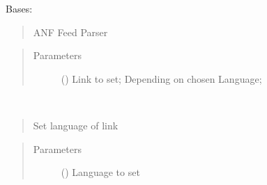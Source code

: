 \documentclass[letterpaper,10pt,english]{sphinxmanual}
\begin{document}
\begin{fulllineitems}
\label{\detokenize{anfrss.parser:anfrss.parser.anffeed.ANFFeed}}
Bases: 
\begin{quote}

ANF Feed Parser
\end{quote}
\begin{quote}\begin{description}
\item[{Parameters}] \leavevmode
{} () \textendash{} Link to set;
Depending on chosen
Language;

\end{description}\end{quote}

\begin{fulllineitems}
\label{\detokenize{anfrss.parser:anfrss.parser.anffeed.ANFFeed.source}}
\end{fulllineitems}


\begin{fulllineitems}
\label{\detokenize{anfrss.parser:anfrss.parser.anffeed.ANFFeed.set_language}}~\begin{quote}

Set language of link
\end{quote}
\begin{quote}\begin{description}
\item[{Parameters}] \leavevmode
{} () \textendash{} Language to set

\end{description}\end{quote}


\end{fulllineitems}
\end{fulllineitems}
\end{document}

